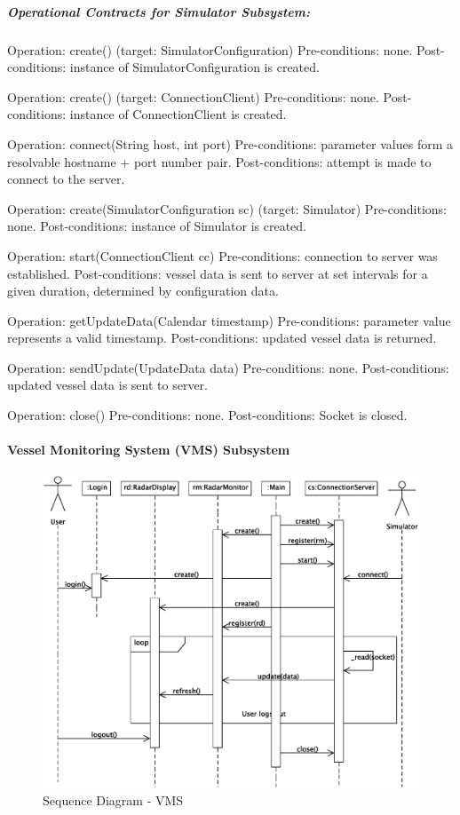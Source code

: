 \documentclass{article}
\begin{document}
\subparagraph{Operational Contracts for Simulator Subsystem:}

Operation: create() (target: SimulatorConfiguration)
Pre-conditions: none.
Post-conditions: instance of SimulatorConfiguration is created.

Operation: create() (target: ConnectionClient)
Pre-conditions: none.
Post-conditions: instance of ConnectionClient is created.

Operation: connect(String host, int port)
Pre-conditions: parameter values form a resolvable hostname + port number pair.
Post-conditions: attempt is made to connect to the server.

Operation: create(SimulatorConfiguration sc) (target: Simulator)
Pre-conditions: none.
Post-conditions: instance of Simulator is created.

Operation: start(ConnectionClient cc)
Pre-conditions: connection to server was established.
Post-conditions: vessel data is sent to server at set intervals for a given duration, determined by configuration data.

Operation: getUpdateData(Calendar timestamp)
Pre-conditions: parameter value represents a valid timestamp.
Post-conditions: updated vessel data is returned.

Operation: sendUpdate(UpdateData data)
Pre-conditions: none.
Post-conditions: updated vessel data is sent to server.

Operation: close()
Pre-conditions: none.
Post-conditions: Socket is closed.

\paragraph{Vessel Monitoring System (VMS) Subsystem}

\begin{figure}[!htb]
\caption{Sequence Diagram - VMS}
\centering
\includegraphics[scale=0.6]{diagrams/vms-sequence-diagram.eps}
\end{figure}
\end{document}
